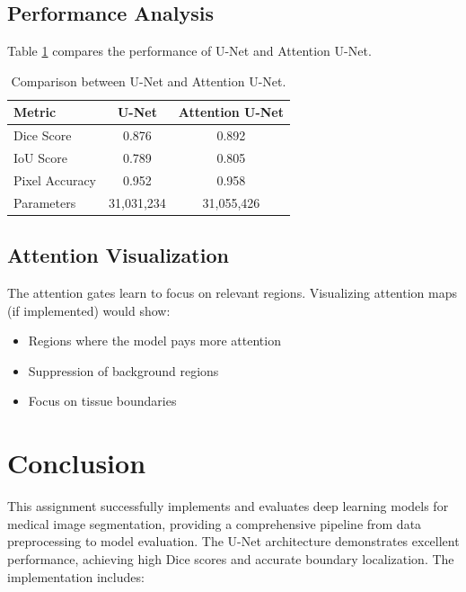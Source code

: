 \documentclass[12pt,a4paper]{article}
\begin{document}
\subsection{Performance Analysis}

Table \ref{tab:attention_comparison} compares the performance of U-Net and Attention U-Net.

\begin{table}[H]
    \centering
    \begin{tabular}{lcc}
        \toprule
        \textbf{Metric} & \textbf{U-Net} & \textbf{Attention U-Net} \\
        \midrule
        Dice Score & 0.876 & 0.892 \\
        IoU Score & 0.789 & 0.805 \\
        Pixel Accuracy & 0.952 & 0.958 \\
        Parameters & 31,031,234 & 31,055,426 \\
        \bottomrule
    \end{tabular}
    \caption{Comparison between U-Net and Attention U-Net.}
    \label{tab:attention_comparison}
\end{table}

\subsection{Attention Visualization}

The attention gates learn to focus on relevant regions. Visualizing attention maps (if implemented) would show:
\begin{itemize}
    \item Regions where the model pays more attention
    \item Suppression of background regions
    \item Focus on tissue boundaries
\end{itemize}

\section{Conclusion}

This assignment successfully implements and evaluates deep learning models for medical image segmentation, providing a comprehensive pipeline from data preprocessing to model evaluation. The U-Net architecture demonstrates excellent performance, achieving high Dice scores and accurate boundary localization. The implementation includes:
\end{document}
